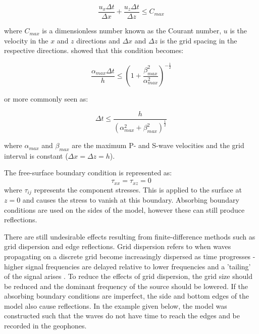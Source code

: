\documentclass[12pt]{article}
\begin{document}
\begin{equation}
	\label{eqn:courant}
	\frac{u_x \Delta t}{\Delta x}+\frac{u_z \Delta t}{\Delta z} \leq C_{max}
\end{equation}		

\noindent where $C_{max}$ is a dimensionless number known as the Courant number, $u$ is the velocity in the $x$ and $z$ directions and $\Delta x$ and $\Delta z$ is the grid spacing in the respective directions. \cite{alterman1970} showed that this condition becomes:

\begin{equation}
	\label{eqn:stabilityA}
	\frac{\alpha_{max} \Delta t}{h} \leq (1+\frac{\beta_{max}^2}{\alpha_{max}^2})^{-\frac{1}{2}}
\end{equation}

\noindent or more commonly seen as:

\begin{equation}
	\label{eqn:stability}
	\Delta t \leq \frac{h}{(\alpha_{max}^2+\beta_{max}^2)^\frac{1}{2}}
\end{equation}	
	
\noindent where $\alpha_{max}$ and $\beta_{max}$ are the maximum P- and S-wave velocities and the grid interval is constant ($\Delta x = \Delta z = h$). 

\noindent The free-surface boundary condition is represented as:
\begin{equation}
	\label{freesurface}
	\tau_{xx}=\tau_{xz}=0
\end{equation}
\noindent where $\tau_{ij}$ represents the component stresses. This is applied to the surface at $z=0$ and causes the stress to vanish at this boundary. Absorbing boundary conditions are used on the sides of the model, however these can still produce reflections.

	There are still undesirable effects resulting from finite-difference methods such as grid dispersion and edge reflections. Grid dispersion refers to when waves propagating on a discrete grid become increasingly dispersed as time progresses - higher signal frequencies are delayed relative to lower frequencies and a 'tailing' of the signal arises \citep{levander1988}. To reduce the effects of grid dispersion, the grid size should be reduced and the dominant frequency of the source should be lowered. If the absorbing boundary conditions are imperfect, the side and bottom edges of the model also cause reflections. In the example given below, the model was constructed such that the waves do not have time to reach the edges and be recorded in the geophones.
	
\end{document}
